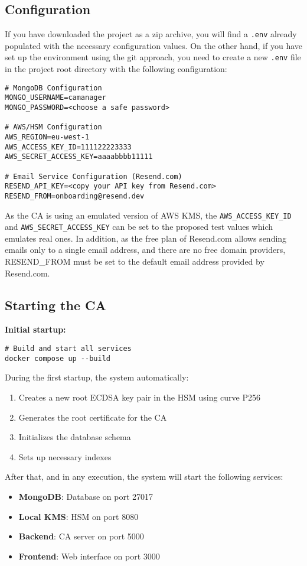 \subsection{Configuration}
If you have downloaded the project as a zip archive, you will find a \texttt{.env} already populated
with the necessary configuration values.
On the other hand, if you have set up the environment using the git approach, you need to create a new
\texttt{.env} file in the project root directory with the following configuration:
\begin{verbatim}
# MongoDB Configuration
MONGO_USERNAME=camanager
MONGO_PASSWORD=<choose a safe password>

# AWS/HSM Configuration
AWS_REGION=eu-west-1
AWS_ACCESS_KEY_ID=111122223333
AWS_SECRET_ACCESS_KEY=aaaabbbb11111

# Email Service Configuration (Resend.com)
RESEND_API_KEY=<copy your API key from Resend.com>
RESEND_FROM=onboarding@resend.dev
\end{verbatim}
As the CA is using an emulated version of AWS KMS, the 
\texttt{AWS\_ACCESS\_KEY\_ID} and \texttt{AWS\_SECRET\_ACCESS\_KEY} can be set to the proposed 
test values which emulates real ones. In addition, as the free plan of Resend.com allows sending 
emails only to a single email address, and there are no free domain providers, RESEND\_FROM must be 
set to the default email address provided by Resend.com.

\subsection{Starting the CA}

\textbf{Initial startup:}
\begin{verbatim}
# Build and start all services
docker compose up --build
\end{verbatim}
During the first startup, the system automatically:
\begin{enumerate}
    \item Creates a new root ECDSA key pair in the HSM using curve P256
    \item Generates the root certificate for the CA
    \item Initializes the database schema
    \item Sets up necessary indexes
\end{enumerate}
After that, and in any execution, the system will start the following services:
\begin{itemize}
    \item \textbf{MongoDB}: Database on port 27017
    \item \textbf{Local KMS}: HSM on port 8080
    \item \textbf{Backend}: CA server on port 5000
    \item \textbf{Frontend}: Web interface on port 3000
\end{itemize}

